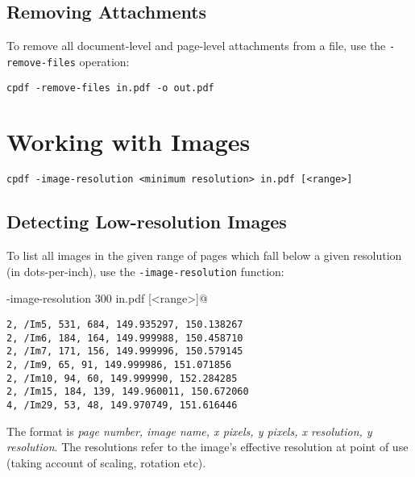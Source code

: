 \documentclass{book}
\begin{document}
  \section{Removing Attachments}
   To remove all document-level and page-level attachments from a file, use the \texttt{-remove-files} operation:
  \begin{framed}
    \small\verb!cpdf -remove-files in.pdf -o out.pdf!
  \end{framed}

\chapter{Working with Images}
\begin{framed}
\noindent\small\verb!cpdf -image-resolution <minimum resolution> in.pdf [<range>]!

\end{framed}
  \section{Detecting Low-resolution Images}
  To list all images in the given range of pages which fall below a given resolution (in dots-per-inch), use the \verb!-image-resolution! function:
  \begin{framed}
  \noindent\small\verb@cpdf -image-resolution 300 in.pdf [<range>]@
  \end{framed}

  \begin{framed}
{\small\begin{verbatim}2, /Im5, 531, 684, 149.935297, 150.138267
2, /Im6, 184, 164, 149.999988, 150.458710
2, /Im7, 171, 156, 149.999996, 150.579145
2, /Im9, 65, 91, 149.999986, 151.071856
2, /Im10, 94, 60, 149.999990, 152.284285
2, /Im15, 184, 139, 149.960011, 150.672060
4, /Im29, 53, 48, 149.970749, 151.616446\end{verbatim}}
  \end{framed}
  \noindent The format is \textit{page number, image name, x pixels, y pixels, x resolution, y resolution}. The resolutions refer to the image's effective resolution at point of use (taking account of scaling, rotation etc).
\end{document}
